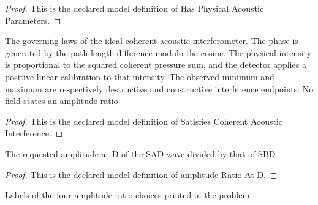 \begin{proof}
  This is the declared model definition of Has Physical Acoustic Parameters.
\end{proof}
\begin{definition}
  \label{def:physics:phyx-mini-0325:phyxminiproblems-problemphyxmini0325-satisfiescoherentacousticinterference}
  The governing laws of the ideal coherent acoustic interferometer. The phase is generated by the path-length difference modulo the cosine. The physical intensity is proportional to the squared coherent pressure sum, and the detector applies a positive linear calibration to that intensity. The observed minimum and maximum are respectively destructive and constructive interference endpoints. No field states an amplitude ratio
\end{definition}
\begin{proof}
  This is the declared model definition of Satisfies Coherent Acoustic Interference.
\end{proof}
\begin{definition}
  \label{def:physics:phyx-mini-0325:phyxminiproblems-problemphyxmini0325-amplituderatioatd}
  The requested amplitude at D of the SAD wave divided by that of SBD
\end{definition}
\begin{proof}
  This is the declared model definition of amplitude Ratio At D.
\end{proof}
\begin{definition}
  \label{def:physics:phyx-mini-0325:phyxminiproblems-problemphyxmini0325-answerchoice}
  Labels of the four amplitude-ratio choices printed in the problem
\end{definition}
